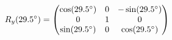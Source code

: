 \documentclass[preview]{standalone}
\begin{document}
\begin{align*}
\special{dvisvgm:raw <g id='unique000'>}R_y(29.5^\circ) = \begin{pmatrix} \cos(29.5^\circ) & 0 & -\sin(29.5^\circ) \\ 0 & 1 & 0 \\ \sin(29.5^\circ) & 0 & \cos(29.5^\circ) \end{pmatrix}\special{dvisvgm:raw </g>}
\end{align*}
\end{document}
